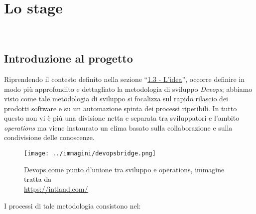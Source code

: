 
\pagestyle{IHA-fancy-style}
\chapter{Lo stage}
\label{cap:lo-stage}

\\

\section{Introduzione al progetto}

Riprendendo il contesto definito nella sezione ``{\hyperref[sec:idea]{1.3 - L'idea}}'', occorre definire in modo più approfondito e dettagliato la metodologia di sviluppo \textit{Devops}; abbiamo visto come tale metodologia di sviluppo si focalizza sul rapido rilascio dei prodotti software e su un automazione spinta dei processi ripetibili. In tutto questo non vi è più una divisione netta e separata tra sviluppatori e l'ambito \textit{operations} ma viene instaurato un clima basato sulla collaborazione e sulla condivisione delle conoscenze. 

\begin{figure}[H]
    \capstart
    \centering
    \texttt{[image: ../immagini/devopsbridge.png]}
    \caption{Devops come punto d'unione tra sviluppo e operations, immagine tratta da \\ \url{https://intland.com/}}
\end{figure}

I processi di tale metodologia consistono nel:

